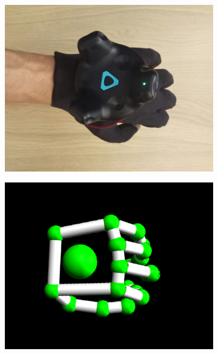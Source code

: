 \documentclass[hyperref, bachelorofscience]{cgvpub}
\begin{document}
\begin{figure}[b!]
\begin{subfigure}{.235\linewidth}
		\includegraphics[width=\linewidth]{../pics/hand_dorsal_nat}
	\end{subfigure}
	\hspace{.01cm}
	\begin{subfigure}{.235\linewidth}
		\includegraphics[width=\linewidth]{../pics/model_dorsal_nat}
	\end{subfigure}
	\begin{subfigure}{.235\linewidth}

\end{subfigure}
\end{figure}
\end{document}
